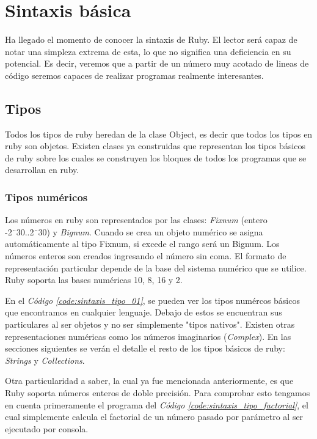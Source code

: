 \documentclass{article}
\newcommand{\refcode}[1]{\textit{Código \ref{#1}}}
\begin{document}
\section{Sintaxis básica}

	Ha llegado el momento de conocer la sintaxis de Ruby. El lector será capaz de notar una simpleza extrema de esta, lo que no significa una deficiencia en su potencial. Es decir, veremos que a partir de un número muy acotado de lineas de código seremos capaces de realizar programas realmente interesantes.


\subsection{Tipos}
Todos los tipos de ruby heredan de la clase Object, es decir que todos los tipos en ruby son objetos. Existen clases ya construidas que representan los tipos básicos de ruby sobre los cuales se construyen los bloques de todos los programas que se desarrollan en ruby.


\subsubsection{Tipos numéricos}
Los números en ruby son representados por las clases: \textit{Fixnum} (entero  -2¨30..2¨30) y \textit{Bignum}.
Cuando se crea un objeto numérico se asigna automáticamente al tipo Fixnum, si excede el rango será un Bignum.
Los números enteros son creados ingresando el número sin coma. El formato de representación particular depende de la base del sistema numérico que se utilice. Ruby soporta las bases numéricas 10, 8, 16 y 2.

 
\bigskip

	En el \refcode{code:sintaxis_tipo_01}, se pueden ver los tipos numércos básicos que encontramos en cualquier lenguaje. Debajo de estos se encuentran sus particulares al ser objetos y no ser simplemente "tipos nativos". Existen otras representaciones numéricas como los números imaginarios (\textit{Complex}). En las secciones siguientes se verán el detalle el resto de los tipos básicos de ruby: \textit{Strings} y \textit{Collections}.
	\par
	Otra particularidad a saber, la cual ya fue mencionada anteriormente, es que Ruby soporta números enteros de doble precisión. Para comprobar esto tengamos en cuenta primeramente el programa del \refcode{code:sintaxis_tipo_factorial}, el cual simplemente calcula el factorial de un número pasado por parámetro al ser ejecutado por consola.
\end{document}
